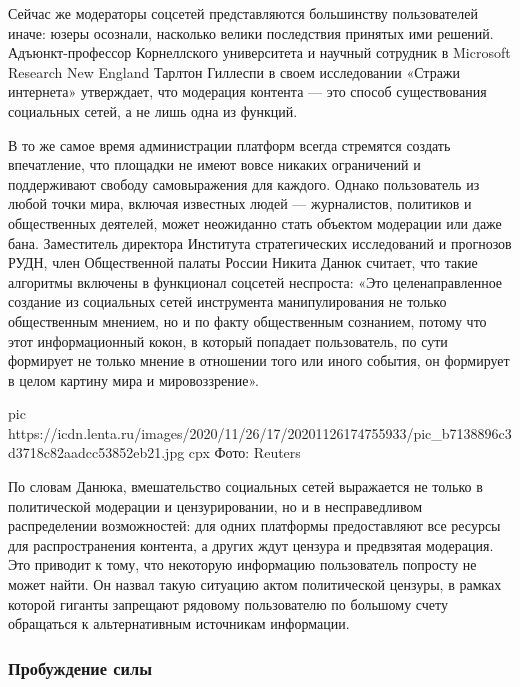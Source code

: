 Сейчас же модераторы соцсетей представляются большинству пользователей иначе:
юзеры осознали, насколько велики последствия принятых ими решений.
Адъюнкт-профессор Корнеллского университета и научный сотрудник в Microsoft
Research New England Тарлтон Гиллеспи в своем исследовании «Стражи интернета»
утверждает, что модерация контента — это способ существования социальных сетей,
а не лишь одна из функций.

В то же самое время администрации платформ всегда стремятся создать
впечатление, что площадки не имеют вовсе никаких ограничений и поддерживают
свободу самовыражения для каждого. Однако пользователь из любой точки мира,
включая известных людей — журналистов, политиков и общественных деятелей, может
неожиданно стать объектом модерации или даже бана. Заместитель директора
Института стратегических исследований и прогнозов РУДН, член Общественной
палаты России Никита Данюк считает, что такие алгоритмы включены в функционал
соцсетей неспроста: «Это целенаправленное создание из социальных сетей
инструмента манипулирования не только общественным мнением, но и по факту
общественным сознанием, потому что этот информационный кокон, в который
попадает пользователь, по сути формирует не только мнение в отношении того или
иного события, он формирует в целом картину мира и мировоззрение».

\ifcmt
pic https://icdn.lenta.ru/images/2020/11/26/17/20201126174755933/pic_b7138896c3d3718c82aadcc53852eb21.jpg
cpx Фото: Reuters
\fi

По словам Данюка, вмешательство социальных сетей выражается не только в
политической модерации и цензурировании, но и в несправедливом распределении
возможностей: для одних платформы предоставляют все ресурсы для распространения
контента, а других ждут цензура и предвзятая модерация. Это приводит к тому,
что некоторую информацию пользователь попросту не может найти. Он назвал такую
ситуацию актом политической цензуры, в рамках которой гиганты запрещают
рядовому пользователю по большому счету обращаться к альтернативным источникам
информации.

\subsubsection{Пробуждение силы}

